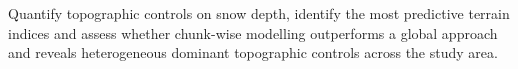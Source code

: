 \section*{}
\noindent
Quantify topographic controls on snow depth, identify the most predictive terrain indices
and assess whether chunk-wise modelling outperforms a global approach and reveals heterogeneous dominant topographic controls across the study area.